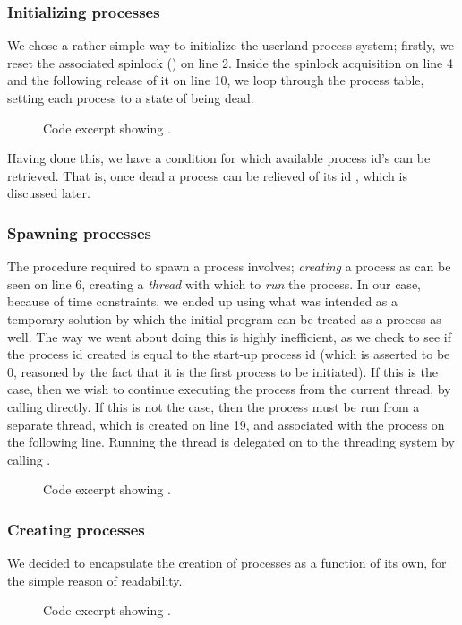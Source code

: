 {\subsubsection{Initializing processes}
We chose a rather simple way to initialize the userland process system;
firstly, we reset the associated spinlock () on
line 2. Inside the spinlock acquisition on line 4 and the following release
of it on line 10, we loop through the process table, setting each process to
a state of being dead.

\begin{figure}[H]
    
    \label{code:process_init}
    \caption{Code excerpt showing .}
\end{figure}

Having done this, we have a condition for which available process id's can be
retrieved. That is, once dead a process can be relieved of its id
, which is discussed later.

\subsubsection{Spawning processes}
The procedure required to spawn a process involves; {\it creating} a process
 as can be seen on line 6, creating a
{\it thread} with which to {\it run} the process. In our case, because of time
constraints, we ended up using what was intended as a temporary solution by
which the initial program can be treated as a process as well. The way we went
about doing this is highly inefficient, as we check to see if the process id
created is equal to the start-up process id (which is asserted to be 0,
reasoned by the fact that it is the first process to be initiated). If this is
the case, then we wish to continue executing the process from the current
thread, by calling  directly. If this is not the case,
then the process must be run from a separate thread, which is created on line
19, and associated with the process on the following line. Running the thread
is delegated on to the threading system by calling .
\begin{figure}[H]
    
    \caption{Code excerpt showing .}
    \label{code:process_spawn}
\end{figure}

\subsubsection{Creating processes}
We decided to encapsulate the creation of processes as a function of its own,
for the simple reason of readability.
\begin{figure}[H]
    
    \caption{Code excerpt showing .}
    \label{code:process_create_process}
\end{figure}

}
